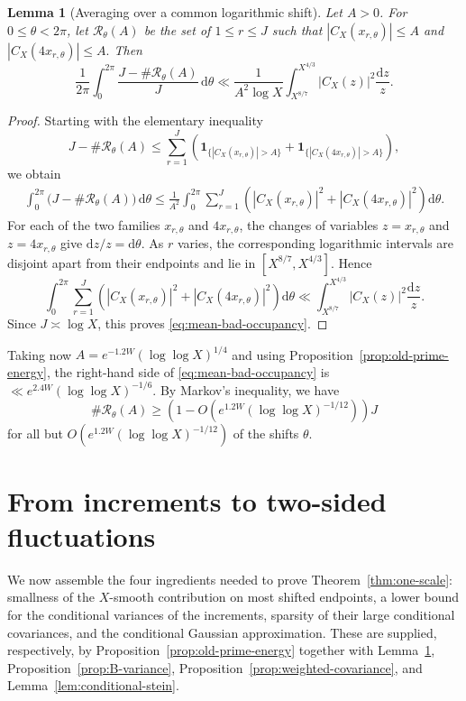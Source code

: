\documentclass[a4paper,12pt,reqno]{amsart}
\numberwithin{equation}{section}
\newtheorem{lemma}[theorem]{Lemma}
\theoremstyle{remark}
\begin{document}
\begin{lemma}[Averaging over a common logarithmic shift]
\label{lem:shift-occupancy}
Let \(A>0\). For \(0\leq\theta<2\pi\), let
\(\mathcal R_\theta(A)\) be the set of \(1\leq r\leq J\) such that
\(
 |C_X(x_{r,\theta})|\leq A\) and \( |C_X(4x_{r,\theta})|\leq A.
\)
Then
\begin{equation}\label{eq:mean-bad-occupancy}
 \frac1{2\pi}\int_0^{2\pi}
 \frac{J-\#\mathcal R_\theta(A)}{J}\,\mathrm{d}\theta
 \ll
 \frac1{A^2\log X}
 \int_{X^{8/7}}^{X^{4/3}}
 |C_X(z)|^2\frac{\mathrm{d}z}{z}.
\end{equation}

\end{lemma}

\begin{proof}
Starting with the elementary inequality
\[
 J-\#\mathcal R_\theta(A)
 \leq
 \sum_{r=1}^J
 \left(
 \mathbf 1_{\{|C_X(x_{r,\theta})|>A\}}
 +
 \mathbf 1_{\{|C_X(4x_{r,\theta})|>A\}}
 \right),
\]
we obtain
\[
 \begin{aligned}
 \int_0^{2\pi}
 \bigl(J-\#\mathcal R_\theta(A)\bigr)\,\mathrm{d}\theta
\leq
 \frac1{A^2}
 \int_0^{2\pi}
 \sum_{r=1}^J
 \left(
 |C_X(x_{r,\theta})|^2
 +
 |C_X(4x_{r,\theta})|^2
 \right)\mathrm{d}\theta.
 \end{aligned}
\]
For each of the two families \(x_{r,\theta}\) and \(4x_{r,\theta}\),
the changes of variables
\(
 z=x_{r,\theta}\)
 {and} \(
 z=4x_{r,\theta}
\)
give \(\mathrm{d}z/z=\mathrm{d}\theta\). As \(r\) varies, the
corresponding logarithmic intervals are disjoint apart from their
endpoints and lie in \([X^{8/7},X^{4/3}]\). Hence
\[
 \int_0^{2\pi}
 \sum_{r=1}^J
 \left(
 |C_X(x_{r,\theta})|^2
 +
 |C_X(4x_{r,\theta})|^2
 \right)\mathrm{d}\theta
 \ll
 \int_{X^{8/7}}^{X^{4/3}}
 |C_X(z)|^2\frac{\mathrm{d}z}{z}.
\]
Since \(J\asymp\log X\), this proves
\eqref{eq:mean-bad-occupancy}.
\end{proof}



Taking now
\(A=e^{-1.2W}(\log\log X)^{1/4}\) and using
Proposition~\ref{prop:old-prime-energy}, the
right-hand side of \eqref{eq:mean-bad-occupancy} is
\(
 \ll e^{2.4W}(\log\log X)^{-1/6}.
\) By Markov's inequality, we have
\[
 \#\mathcal R_\theta(A)
 \ge
 \left(1-O\!\left(
 e^{1.2W}(\log\log X)^{-1/12}
 \right)\right)J
\]
for all but
\(O(e^{1.2W}(\log\log X)^{-1/12})\) of the shifts \(\theta\).


\section{From increments to two-sided fluctuations}\label{sec:two-sided}
We now assemble the four ingredients needed to prove Theorem~\ref{thm:one-scale}:
smallness of the \(X\)-smooth contribution on most shifted endpoints,
a lower bound for the conditional variances of the increments, sparsity
of their large conditional covariances, and the conditional Gaussian
approximation. These are supplied, respectively, by
Proposition~\ref{prop:old-prime-energy} together with
Lemma~\ref{lem:shift-occupancy},
Proposition~\ref{prop:B-variance},
Proposition~\ref{prop:weighted-covariance}, and
Lemma~\ref{lem:conditional-stein}.
\end{document}
